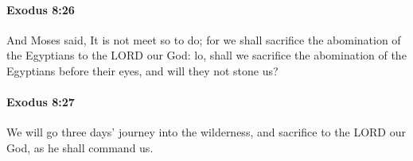 		\paragraph{Exodus 8:26} %
			\label{EXODUS-8-26}

			And Moses said, It is not meet so to do; for we shall sacrifice the abomination of the Egyptians to the LORD our God: lo, shall we sacrifice the abomination of the Egyptians before their eyes, and will they not stone us?


		\paragraph{Exodus 8:27} %
			\label{EXODUS-8-27}

			We will go three days' journey into the wilderness, and sacrifice to the LORD our God, as he shall command us.


